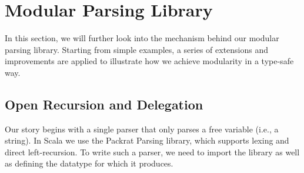 \section{Modular Parsing Library}\label{sec:library}


In this section, we will further look into the mechanism behind our modular parsing library.
Starting from simple examples, a series of extensions and improvements are applied to illustrate
how we achieve modularity in a type-safe way.

\subsection{Open Recursion and Delegation}\label{subsec:openrecursion}

Our story begins with a single parser that only parses a free variable (i.e., a string). In Scala we use the Packrat Parsing
library, which supports lexing and direct left-recursion. To write such a parser, we need to import the library as
well as defining the datatype for which it produces.

